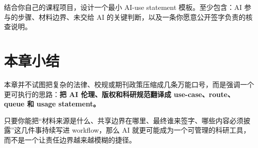 \begin{exercisebox}[开放练习]
结合你自己的课程项目，设计一个最小 AI-use statement 模板。至少包含：AI 参与的步骤、材料边界、未交给 AI 的关键判断，以及一条你愿意公开签字负责的核查说明。
\end{exercisebox}

\section{本章小结}

本章并不试图把复杂的法律、校规或期刊政策压缩成几条万能口号，而是强调一个更可执行的思路：\textbf{把 AI 伦理、版权和科研规范翻译成 use-case、route、queue 和 usage statement。}

只要你能把“材料来源是什么、共享边界在哪里、最终谁来签字、哪些内容必须披露”这几件事持续写进 workflow，那么 AI 就更可能成为一个可管理的科研工具，而不是一个让责任边界越来越模糊的捷径。
